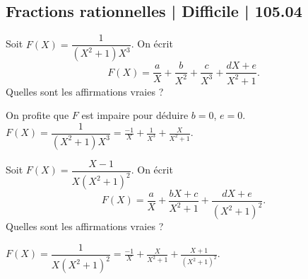 \subsection{Fractions rationnelles | Difficile | 105.04}



\begin{question}

Soit $F(X) = \dfrac{1}{(X^2+1)X^3}$.
On écrit 
$$F(X) = \frac{a}{X} + \frac{b}{X^2} +  \frac{c}{X^3}
+ \frac{dX+e}{X^2+1}.$$
Quelles sont les affirmations vraies ?
\begin{answers}



\end{answers}
\begin{explanations}
On profite que $F$ est impaire pour déduire $b=0$, $e=0$.
$F(X) = \dfrac{1}{(X^2+1)X^3} = \frac{-1}{X}  +  \frac{1}{X^3}
+ \frac{X}{X^2+1}.$
\end{explanations}
\end{question}


\begin{question}

Soit $F(X) = \dfrac{X-1}{X(X^2+1)^2}$.
On écrit 
$$F(X) = \frac{a}{X} + \frac{bX+c}{X^2+1} +  \frac{dX+e}{(X^2+1)^2}.$$
Quelles sont les affirmations vraies ?
\begin{answers}



    
\end{answers}
\begin{explanations}
$F(X) = \dfrac{1}{X(X^2+1)^2} = \frac{-1}{X} + \frac{X}{X^2+1} +  \frac{X+1}{(X^2+1)^2}.$
\end{explanations}
\end{question}

